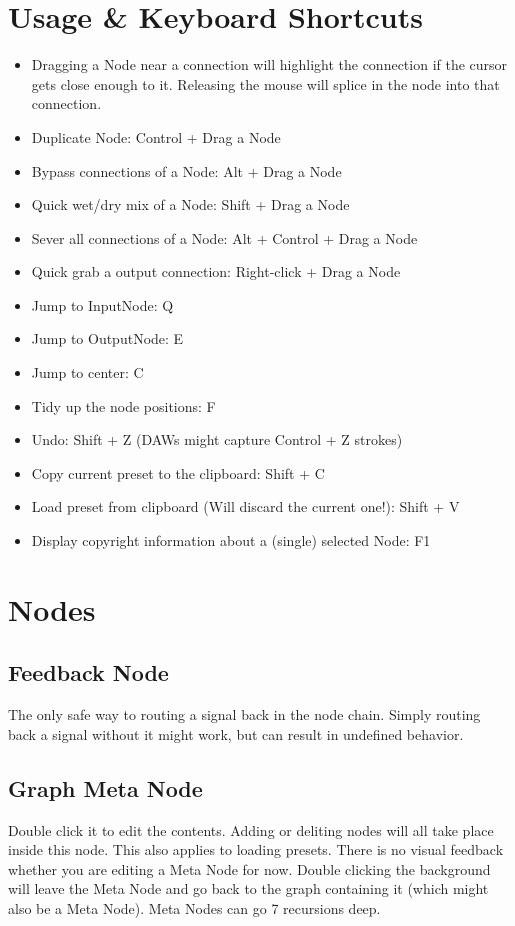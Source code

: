 \documentclass[a4paper,14pt]{report}
\begin{document}
\chapter{Usage \& Keyboard Shortcuts}
\begin{itemize}
  \item Dragging a Node near a connection will highlight the connection if the cursor gets close enough to it. Releasing the mouse will splice in the node into that connection.
  \item Duplicate Node: Control + Drag a Node
  \item Bypass connections of a Node: Alt + Drag a Node
  \item Quick wet/dry mix of a Node: Shift + Drag a Node
  \item Sever all connections of a Node: Alt + Control + Drag a Node
  \item Quick grab a output connection: Right-click + Drag a Node
  \item Jump to InputNode: Q
  \item Jump to OutputNode: E
  \item Jump to center: C
  \item Tidy up the node positions: F
  \item Undo: Shift + Z (DAWs might capture Control + Z strokes)
  \item Copy current preset to the clipboard: Shift + C
  \item Load preset from clipboard (Will discard the current one!): Shift + V
  \item Display copyright information about a (single) selected Node: F1
\end{itemize}

\chapter{Nodes}
\section{Feedback Node}
The only safe way to routing a signal back in the node chain.
Simply routing back a signal without it might work, but can result in undefined behavior.

\section{Graph Meta Node}
Double click it to edit the contents. Adding or deliting nodes will all take place inside this node. This also applies to loading presets.
There is no visual feedback whether you are editing a Meta Node for now.
Double clicking the background will leave the Meta Node and go back to the graph containing it (which might also be a Meta Node).
Meta Nodes can go 7 recursions deep.
\end{document}
